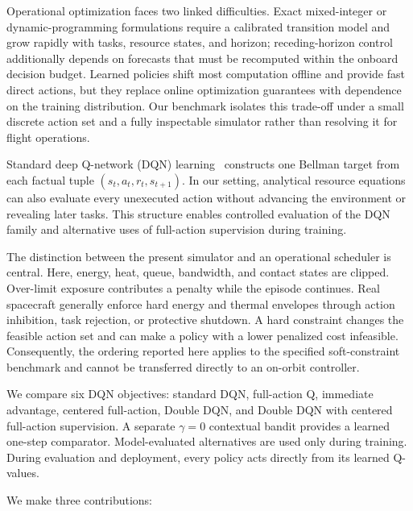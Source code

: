 \documentclass[remotesensing,article,submit,moreauthors]{Definitions/mdpi}
\newenvironment{revisedblock}{\color{red}}{}
\newenvironment{revisedblock}{}{}
\begin{document}
\begin{revisedblock}
Operational optimization faces two linked difficulties. Exact mixed-integer or dynamic-programming formulations require a calibrated transition model and grow rapidly with tasks, resource states, and horizon; receding-horizon control additionally depends on forecasts that must be recomputed within the onboard decision budget. Learned policies shift most computation offline and provide fast direct actions, but they replace online optimization guarantees with dependence on the training distribution. Our benchmark isolates this trade-off under a small discrete action set and a fully inspectable simulator rather than resolving it for flight operations.

Standard deep Q-network (DQN) learning~\cite{mnih2015human,watkins1992q} constructs one Bellman target from each factual tuple $(s_t,a_t,r_t,s_{t+1})$. In our setting, analytical resource equations can also evaluate every unexecuted action without advancing the environment or revealing later tasks. This structure enables controlled evaluation of the DQN family and alternative uses of full-action supervision during training.

The distinction between the present simulator and an operational scheduler is central. Here, energy, heat, queue, bandwidth, and contact states are clipped. Over-limit exposure contributes a penalty while the episode continues. Real spacecraft generally enforce hard energy and thermal envelopes through action inhibition, task rejection, or protective shutdown. A hard constraint changes the feasible action set and can make a policy with a lower penalized cost infeasible. Consequently, the ordering reported here applies to the specified soft-constraint benchmark and cannot be transferred directly to an on-orbit controller.
\end{revisedblock}

We compare six DQN objectives: standard DQN, full-action Q, immediate advantage, centered full-action, Double DQN, and Double DQN with centered full-action supervision. A separate $\gamma=0$ contextual bandit provides a learned one-step comparator. Model-evaluated alternatives are used only during training. During evaluation and deployment, every policy acts directly from its learned Q-values.

We make three contributions:
\end{document}
